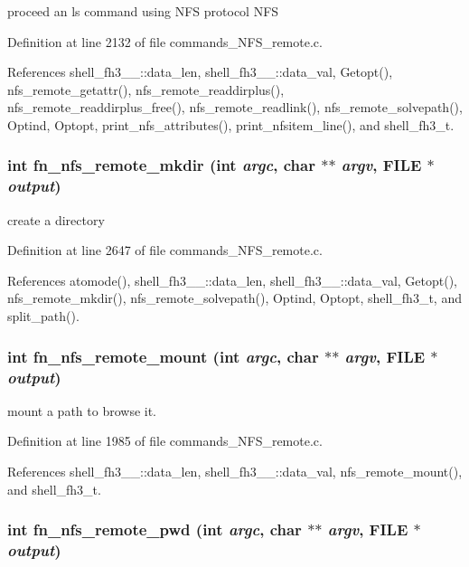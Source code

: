proceed an ls command using NFS protocol NFS 

Definition at line 2132 of file commands\_\-NFS\_\-remote.c.

References shell\_\-fh3\_\-\_\-::data\_\-len, shell\_\-fh3\_\-\_\-::data\_\-val, Getopt(), nfs\_\-remote\_\-getattr(), nfs\_\-remote\_\-readdirplus(), nfs\_\-remote\_\-readdirplus\_\-free(), nfs\_\-remote\_\-readlink(), nfs\_\-remote\_\-solvepath(), Optind, Optopt, print\_\-nfs\_\-attributes(), print\_\-nfsitem\_\-line(), and shell\_\-fh3\_\-t.
\subsubsection{\setlength{\rightskip}{0pt plus 5cm}int fn\_\-nfs\_\-remote\_\-mkdir (int {\em argc}, char $\ast$$\ast$ {\em argv}, FILE $\ast$ {\em output})}\label{commands_8h_a92}


create a directory 

Definition at line 2647 of file commands\_\-NFS\_\-remote.c.

References atomode(), shell\_\-fh3\_\-\_\-::data\_\-len, shell\_\-fh3\_\-\_\-::data\_\-val, Getopt(), nfs\_\-remote\_\-mkdir(), nfs\_\-remote\_\-solvepath(), Optind, Optopt, shell\_\-fh3\_\-t, and split\_\-path().
\subsubsection{\setlength{\rightskip}{0pt plus 5cm}int fn\_\-nfs\_\-remote\_\-mount (int {\em argc}, char $\ast$$\ast$ {\em argv}, FILE $\ast$ {\em output})}\label{commands_8h_a88}


mount a path to browse it. 

Definition at line 1985 of file commands\_\-NFS\_\-remote.c.

References shell\_\-fh3\_\-\_\-::data\_\-len, shell\_\-fh3\_\-\_\-::data\_\-val, nfs\_\-remote\_\-mount(), and shell\_\-fh3\_\-t.
\subsubsection{\setlength{\rightskip}{0pt plus 5cm}int fn\_\-nfs\_\-remote\_\-pwd (int {\em argc}, char $\ast$$\ast$ {\em argv}, FILE $\ast$ {\em output})}\label{commands_8h_a90}



